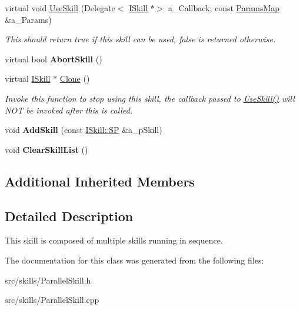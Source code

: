 \begin{DoxyCompactItemize}
virtual void \hyperlink{class_parallel_skill_ad95fee894046921fb0d3e9c91034737e}{Use\+Skill} (Delegate$<$ \hyperlink{class_i_skill}{I\+Skill} $\ast$$>$ a\+\_\+\+Callback, const \hyperlink{class_params_map}{Params\+Map} \&a\+\_\+\+Params)
\begin{DoxyCompactList}\small\item\em This should return true if this skill can be used, false is returned otherwise. \end{DoxyCompactList}\item 
\mbox{\label{class_parallel_skill_aef491a05fe20e3805ba7a42ef2f3bba3}} 
virtual bool {\bfseries Abort\+Skill} ()
\item 
\mbox{\label{class_parallel_skill_a5c559b7917042634e3c2b09ffeaa5a7c}} 
virtual \hyperlink{class_i_skill}{I\+Skill} $\ast$ \hyperlink{class_parallel_skill_a5c559b7917042634e3c2b09ffeaa5a7c}{Clone} ()
\begin{DoxyCompactList}\small\item\em Invoke this function to stop using this skill, the callback passed to \hyperlink{class_parallel_skill_ad95fee894046921fb0d3e9c91034737e}{Use\+Skill()} will N\+OT be invoked after this is called. \end{DoxyCompactList}\item 
\mbox{\label{class_parallel_skill_aebc7c4e32af3abe65d22c52e461bd7f2}} 
void {\bfseries Add\+Skill} (const \hyperlink{class_i_skill_a68bcce999ab0444eebaca3fb8ddb8a31}{I\+Skill\+::\+SP} \&a\+\_\+p\+Skill)
\item 
\mbox{\label{class_parallel_skill_adb8d923896f90ac909a755712bdeee01}} 
void {\bfseries Clear\+Skill\+List} ()
\end{DoxyCompactItemize}
\subsection*{Additional Inherited Members}


\subsection{Detailed Description}
This skill is composed of multiple skills running in sequence. 

The documentation for this class was generated from the following files\+:\begin{DoxyCompactItemize}
\item 
src/skills/Parallel\+Skill.\+h\item 
src/skills/Parallel\+Skill.\+cpp\end{DoxyCompactItemize}
